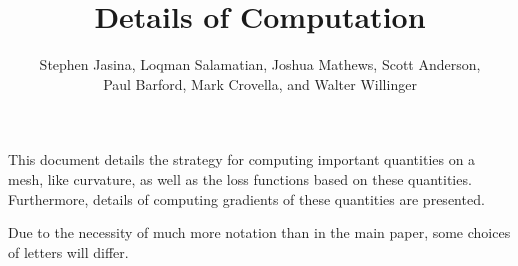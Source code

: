 \documentclass[journal,onecolumn]{vgtc}                     %
\title{Details of Computation}
\author{%
  \texorpdfstring{Stephen Jasina, Loqman Salamatian, Joshua Mathews, Scott Anderson, \\ Paul Barford, Mark Crovella, and Walter Willinger}{Stephen Jasina, Loqman Salamatian, Joshua Mathews, Scott Anderson, Paul Barford, Mark Crovella, and Walter Willinger}
}
\begin{document}
	\maketitle

	This document details the strategy for computing important quantities on a mesh, like curvature, as well as the loss functions based on these quantities. Furthermore, details of computing gradients of these quantities are presented.

	Due to the necessity of much more notation than in the main paper, some choices of letters will differ.

	

	


	


	

	

	

	
\end{document}
